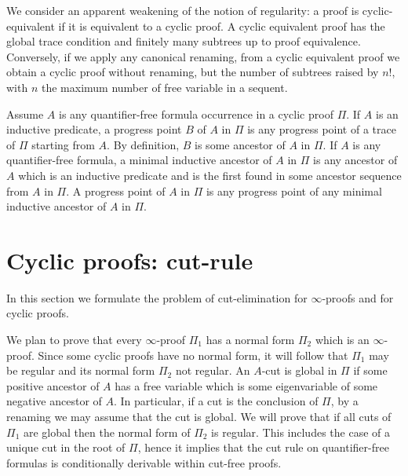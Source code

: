 \documentclass[a4paper,12pt]{article}
\begin{document}
We consider an apparent weakening of the notion of regularity: a proof is cyclic-equivalent if it is equivalent to a cyclic proof.  A cyclic equivalent proof has the global trace condition and finitely many subtrees up to proof equivalence. Conversely, if we apply any canonical renaming, from a cyclic equivalent proof we obtain a cyclic proof without renaming, but the number of subtrees raised by $n!$, with $n$ the maximum number of free variable in a sequent. 


Assume $A$ is any quantifier-free formula occurrence in a cyclic proof $\Pi$. If $A$ is an inductive predicate, a progress point $B$ of $A$ in $\Pi$ is any progress point of a trace of $\Pi$ starting from $A$. By definition, $B$ is some ancestor of $A$ in $\Pi$.  If $A$ is any quantifier-free formula, a minimal inductive ancestor of $A$ in $\Pi$ is any ancestor of $A$ which is an inductive predicate and is the first found in some ancestor sequence from $A$ in $\Pi$. A progress point of $A$ in $\Pi$ is any progress point of any minimal inductive ancestor of $A$ in $\Pi$. 


\section{Cyclic proofs: cut-rule}
In this section we formulate the problem of cut-elimination for $\infty$-proofs and for cyclic proofs.

We plan to prove that every $\infty$-proof $\Pi_1$ has a normal form $\Pi_2$ which is an $\infty$-proof. Since some cyclic proofs have no normal form, it will follow that $\Pi_1$ may be regular and its normal form $\Pi_2$ not regular. An $A$-cut is global in $\Pi$ if some positive ancestor of $A$ has a free variable which is some eigenvariable of some negative ancestor of $A$. In particular, if a cut is the conclusion of $\Pi$, by a renaming we may assume that the cut is global. We will prove that if all cuts of $\Pi_1$ are global then the normal form of $\Pi_2$ is regular. This includes the case of a unique cut in the root of $\Pi$, hence it implies that the cut rule on quantifier-free formulas is conditionally derivable within cut-free proofs. 
\end{document}
